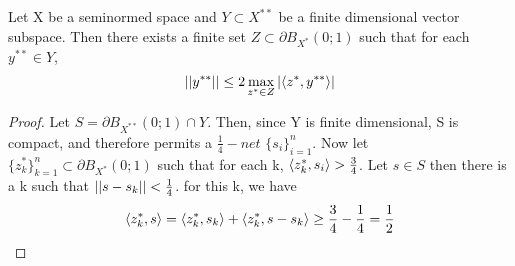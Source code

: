 \begin{lem}
    \label{lem:finiteselection}
    Let X be a seminormed space and $Y \subset X^{**}$ be a finite dimensional vector subspace. Then there exists a finite set $Z \subset \partial B_{X^*}(0;1)$ such that for each $y^{**} \in Y$, 
    \begin{equation}
        \left|\left| y^{**} \right|\right| \leq 2 \max\limits_{z^* \in Z} \left| \left\langle z^*,y^{**} \right\rangle \right|
    \end{equation}
    \begin{proof}
        Let $S=\partial B_{X^{**}}(0;1) \cap Y$. Then, since Y is finite dimensional, S is compact, and therefore permits a $\frac{1}{4}-net$ $\{s_i\}_{i=1}^n$. 
        Now let $\{z_k^*\}_{k=1}^n  \subset \partial B_{X^*}(0;1)$ such that for each k, $\left\langle z_k^*,s_i \right\rangle > \frac{3}{4}$.
        Let $s \in S$ then there is a k such that $\left|\left| s-s_k \right|\right|< \frac{1}{4}$. for this k, we have
        \begin{equation}
            \left\langle z_k^*,s \right\rangle = \left\langle z_k^*,s_k \right\rangle + \left\langle z_k^*,s-s_k \right\rangle \geq \frac{3}{4}-\frac{1}{4} = \frac{1}{2}
        \end{equation}
    \end{proof} 
\end{lem}

